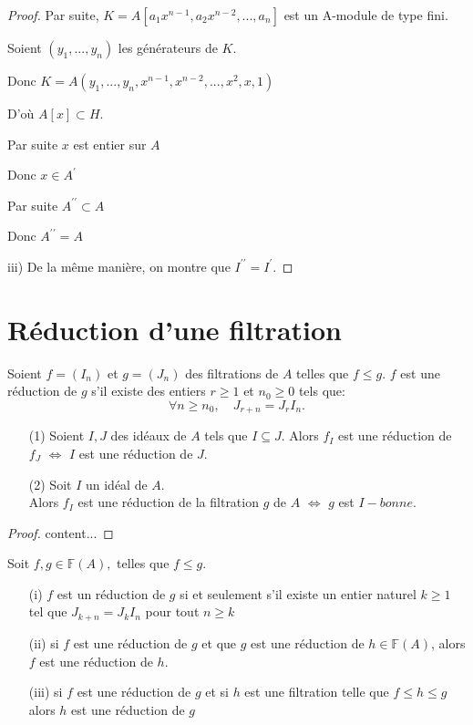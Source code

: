 \begin{proof}
	Par suite, $K=A[a_{1}x^{n-1},a_{2}x^{n-2},...,a_{n}]$ est un A-module de
	type fini.
	
	Soient $(y_{1},...,y_{n})$ les générateurs de $K.$
	
	Donc $K=A(y_{1},...,y_{n},x^{n-1},x^{n-2},...,x^{2},x,1)$
	
	D'où $A[x]\subset H.$
	
	Par suite $x$ est entier sur $A$
	
	Donc $x\in A^{\prime }$
	
	Par suite $A^{\prime \prime }\subset A$
	
	Donc  $A^{\prime \prime }=A$
	
	iii) De la m\^{e}me manière, on montre que $I^{\prime \prime }=I^{\prime
	}.$
\end{proof}
\section{Réduction d'une filtration}
\begin{madefinition}
	Soient $f = (I_n)$ et $g=(J_n)$ des filtrations de $A$ telles que $f \leqslant g$.
	$f$ est une réduction de $g$ s'il existe des entiers $r \geqslant 1$ et $n_0 \geqslant 0$ tels que:
	\[ \forall n \geqslant n_0,\quad J_{r+n} = J_{r}I_{n}. \]
\end{madefinition}
\begin{maremarque}
	\begin{enumerate}
		\item[(1)] Soient $I,J$ des idéaux de $A$ tels que $I \subseteq J$. Alors $f_I$ est une réduction de $f_J$ $\Longleftrightarrow$ $I$ est une réduction de $J$.
		\item[(2)] Soit $I$ un idéal de $A$.\\ Alors $f_I$ est une réduction de la filtration $g$ de $A$ $\Longleftrightarrow$ $g$ est $I-bonne$.
	\end{enumerate}
\end{maremarque}
\begin{proof}
	content...
\end{proof}
\begin{maproposition}
	Soit $f,g \in \mathbb{F}(A),$ telles que $f \leqslant g$.
	\begin{enumerate}
		\item[(i)] $f$ est un réduction de $g$ si et seulement s'il existe un entier naturel $k \geqslant 1$ tel que $J_{k+n}  = J_{k}I_n$ pour tout $n \geqslant k$
		\item[(ii)] si $f$ est une réduction de $g$ et que $g$ est une réduction de $h \in \mathbb{F}(A)$, alors $f$ est une réduction de $h$. 
		\item[(iii)] si $f$ est une réduction de $g$ et si $h$ est une filtration telle que $f \leqslant h \leqslant g$ alors $h$ est une réduction de $g$
	\end{enumerate}
\end{maproposition}
